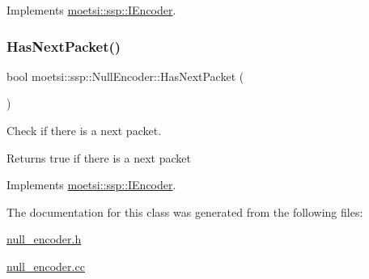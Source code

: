 Implements \hyperlink{classmoetsi_1_1ssp_1_1IEncoder_ae6a865aa52230d81aed1cb5232402f6c}{moetsi\+::ssp\+::\+I\+Encoder}.

\mbox{\label{classmoetsi_1_1ssp_1_1NullEncoder_a359eb668c16a1ef7963214f7f6303af4}} 
\subsubsection{\texorpdfstring{Has\+Next\+Packet()}{HasNextPacket()}}
{\footnotesize\ttfamily bool moetsi\+::ssp\+::\+Null\+Encoder\+::\+Has\+Next\+Packet (\begin{DoxyParamCaption}{ }\end{DoxyParamCaption})\hspace{0.3cm}{\ttfamily [virtual]}}



Check if there is a next packet. 

\begin{DoxyReturn}{Returns}
true if there is a next packet 
\end{DoxyReturn}


Implements \hyperlink{classmoetsi_1_1ssp_1_1IEncoder_a2af8e23d841ef61f6ee4037e56a3694d}{moetsi\+::ssp\+::\+I\+Encoder}.



The documentation for this class was generated from the following files\+:\begin{DoxyCompactItemize}
\item 
\hyperlink{null__encoder_8h}{null\+\_\+encoder.\+h}\item 
\hyperlink{null__encoder_8cc}{null\+\_\+encoder.\+cc}\end{DoxyCompactItemize}
